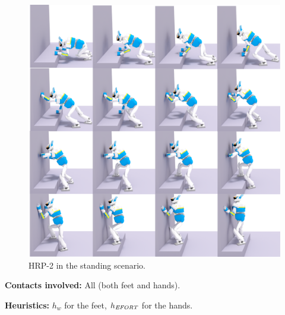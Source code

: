 \begin{figure}
  \centering
  \includegraphics[width=1\linewidth]{figures/standing}
  \caption{
           HRP-2 in the standing scenario. }
		   \label{fig:standing}
\end{figure}


\noindent\textbf{Contacts involved:} All (both feet and hands).

\noindent\textbf{Heuristics:} $h_w$ for the feet, $h_{\textrm{\it EFORT}}$  for the hands.



